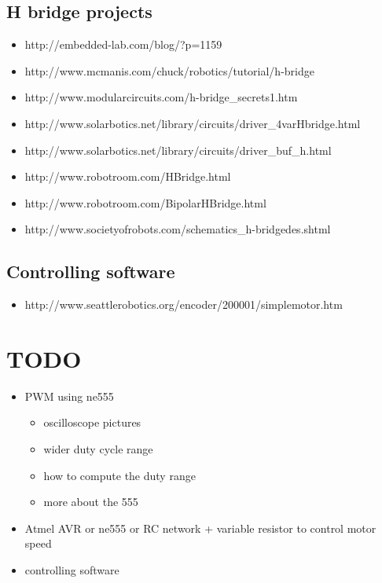 \documentclass[12pt]{article}
\begin{document}
\subsection{H bridge projects}
\begin{itemize}
  \item http://embedded-lab.com/blog/?p=1159
  \item http://www.mcmanis.com/chuck/robotics/tutorial/h-bridge
  \item http://www.modularcircuits.com/h-bridge\_secrets1.htm
  \item http://www.solarbotics.net/library/circuits/driver\_4varHbridge.html
  \item http://www.solarbotics.net/library/circuits/driver\_buf\_h.html
  \item http://www.robotroom.com/HBridge.html
  \item http://www.robotroom.com/BipolarHBridge.html
  \item http://www.societyofrobots.com/schematics\_h-bridgedes.shtml
\end{itemize}

\subsection{Controlling software}
\begin{itemize}
  \item http://www.seattlerobotics.org/encoder/200001/simplemotor.htm
\end{itemize}


\section{TODO}

\begin{itemize}
\item PWM using ne555
\begin{itemize}
  \item oscilloscope pictures
  \item wider duty cycle range
  \item how to compute the duty range
  \item more about the 555
\end{itemize}
\item Atmel AVR or ne555 or RC network + variable resistor to control motor speed
\item controlling software 
\end{itemize}
\end{document}
